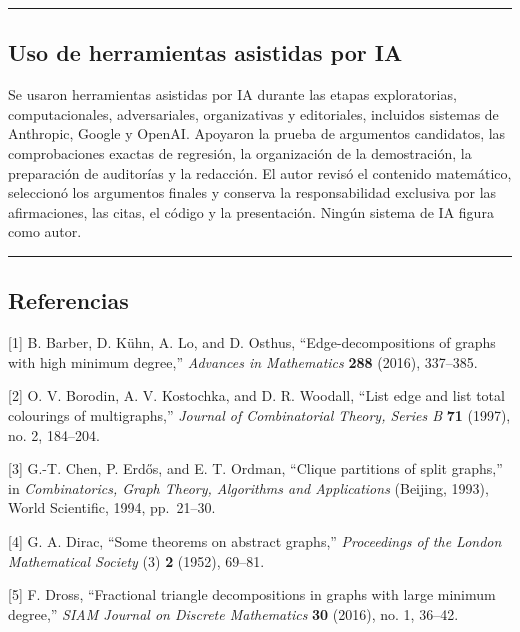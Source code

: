 \documentclass[
  11pt,
]{article}
\begin{document}
\begin{center}\rule{0.5\linewidth}{0.5pt}\end{center}

\subsection{Uso de herramientas asistidas por IA}\label{uso-de-herramientas-asistidas-por-ia}

Se usaron herramientas asistidas por IA durante las etapas exploratorias, computacionales, adversariales, organizativas y editoriales, incluidos sistemas de Anthropic, Google y OpenAI. Apoyaron la prueba de argumentos candidatos, las comprobaciones exactas de regresión, la organización de la demostración, la preparación de auditorías y la redacción. El autor revisó el contenido matemático, seleccionó los argumentos finales y conserva la responsabilidad exclusiva por las afirmaciones, las citas, el código y la presentación. Ningún sistema de IA figura como autor.

\begin{center}\rule{0.5\linewidth}{0.5pt}\end{center}

\subsection{Referencias}\label{referencias}

{[}1{]} B. Barber, D. Kühn, A. Lo, and D. Osthus, ``Edge-decompositions of graphs with high minimum degree,'' \emph{Advances in Mathematics} \textbf{288} (2016), 337--385.

{[}2{]} O. V. Borodin, A. V. Kostochka, and D. R. Woodall, ``List edge and list total colourings of multigraphs,'' \emph{Journal of Combinatorial Theory, Series B} \textbf{71} (1997), no. 2, 184--204.

{[}3{]} G.-T. Chen, P. Erdős, and E. T. Ordman, ``Clique partitions of split graphs,'' in \emph{Combinatorics, Graph Theory, Algorithms and Applications} (Beijing, 1993), World Scientific, 1994, pp.~21--30.

{[}4{]} G. A. Dirac, ``Some theorems on abstract graphs,'' \emph{Proceedings of the London Mathematical Society} (3) \textbf{2} (1952), 69--81.

{[}5{]} F. Dross, ``Fractional triangle decompositions in graphs with large minimum degree,'' \emph{SIAM Journal on Discrete Mathematics} \textbf{30} (2016), no. 1, 36--42.
\end{document}
